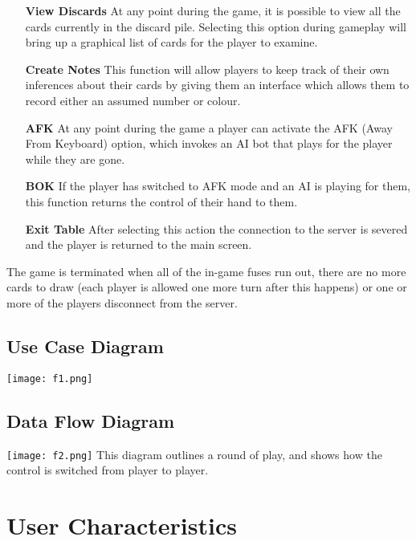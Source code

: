 \documentclass[12pt]{article}
\begin{document}
\begin{itemize}
    
\item[\textbf{View Discards}]
    At any point during the game, it is possible to view all the cards
    currently in the discard pile. Selecting this option during
    gameplay will bring up a graphical list of cards for the player to examine.

\item[\textbf{Create Notes}]
    This function will allow players to keep track of their own inferences
    about their cards by giving them an interface which allows them to record 
    either an assumed number or colour.

\item[\textbf{AFK}]
    At any point during the game a player can activate the AFK (Away From 
    Keyboard) option, which invokes an AI bot that plays for the player while
    they are gone. 

\item[\textbf{BOK}]
    If the player has switched to AFK mode and an AI is playing for them, this
    function returns the control of their hand to them.

\item[\textbf{Exit Table}]
    After selecting this action the connection to the server is severed and
    the player is returned to the main screen.
\end{itemize}

The game is terminated when all of the in-game fuses run out, there are no more
cards to draw (each player is allowed one more turn after this happens) or one or 
more of the players disconnect from the server.

\subsection{Use Case Diagram}

\texttt{[image: f1.png]}
\subsection{Data Flow Diagram}
\texttt{[image: f2.png]}
\newline
This diagram outlines a round of play, and shows how the control is switched from player
to player.

\section{User Characteristics}
\end{document}
